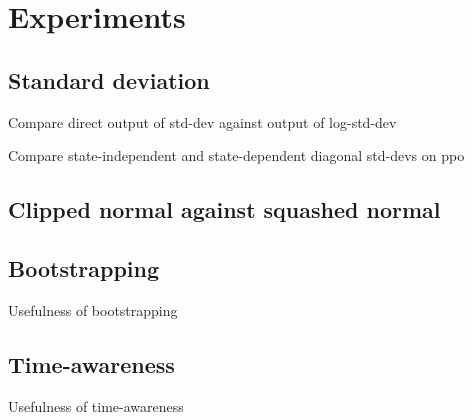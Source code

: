 \chapter{Experiments}

\section{Standard deviation}

Compare direct output of std-dev against output of log-std-dev 

Compare state-independent and state-dependent diagonal std-devs on ppo

\section{Clipped normal against squashed normal}

\section{Bootstrapping}

Usefulness of bootstrapping

\section{Time-awareness}

Usefulness of time-awareness